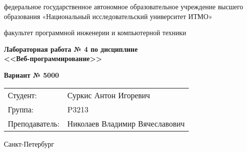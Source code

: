 \begin{titlepage}
	\newpage
	\begin{center}

		федеральное государственное автономное образовательное учреждение высшего образования
		«Национальный исследовательский университет ИТМО»

		\bigskip

		факультет программной инженерии и компьютерной техники

		\vfill

		\textbf{
		\Large
		Лабораторная работа № 4 по дисциплине \\
		<<Веб-программирование>>
		}

		\medskip

		\textbf{
		\Large
		Вариант № 5000
		}
	\end{center}

	\bigskip

	\hfill
	\begin{tabular}{l@{ }l}
		Студент:       & Суркис Антон Игоревич \\
		Группа:        & P3213 \\
		Преподаватель: & Николаев Владимир Вячеславович \\
	\end{tabular}

	\vfill

	\begin{center}
		Санкт-Петербург\\
		\the\year
	\end{center}
\end{titlepage}

